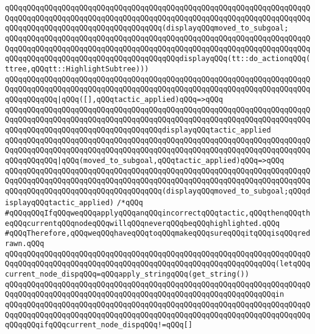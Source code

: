 \verb|qQQqqQQqqQQqqQQqqQQqqQQqqQQqqQQqqQQqqQQqqQQqqQQqqQQqqQQqqQQqqQQqqQQqqQQqqQQqqQQqqQQqqQQqqQQqqQQqqQQqqQQqqQQqqQQqqQQqqQQqqQQqqQQqqQQqqQQqqQQqqQQqqQQqqQQqqQQqqQQqqQQqqQQqqQQqqQQq(displayqQQqmoved_to_subgoal;|\newline
\verb|qQQqqQQqqQQqqQQqqQQqqQQqqQQqqQQqqQQqqQQqqQQqqQQqqQQqqQQqqQQqqQQqqQQqqQQqqQQqqQQqqQQqqQQqqQQqqQQqqQQqqQQqqQQqqQQqqQQqqQQqqQQqqQQqqQQqqQQqqQQqqQQqqQQqqQQqqQQqqQQqqQQqqQQqqQQqqQQqqQQqdisplayqQQq(tt::do_actionqQQq(ttree,qQQqtt::HighlightSubtree)))|\newline
\verb|qQQqqQQqqQQqqQQqqQQqqQQqqQQqqQQqqQQqqQQqqQQqqQQqqQQqqQQqqQQqqQQqqQQqqQQqqQQqqQQqqQQqqQQqqQQqqQQqqQQqqQQqqQQqqQQqqQQqqQQqqQQqqQQqqQQqqQQqqQQqqQQqqQQqqQQq|\verb#|qQQq([],qQQqtactic_applied)qQQq=>qQQq#\newline
\verb|qQQqqQQqqQQqqQQqqQQqqQQqqQQqqQQqqQQqqQQqqQQqqQQqqQQqqQQqqQQqqQQqqQQqqQQqqQQqqQQqqQQqqQQqqQQqqQQqqQQqqQQqqQQqqQQqqQQqqQQqqQQqqQQqqQQqqQQqqQQqqQQqqQQqqQQqqQQqqQQqqQQqqQQqqQQqqQQqdisplayqQQqtactic_applied|\newline
\verb|qQQqqQQqqQQqqQQqqQQqqQQqqQQqqQQqqQQqqQQqqQQqqQQqqQQqqQQqqQQqqQQqqQQqqQQqqQQqqQQqqQQqqQQqqQQqqQQqqQQqqQQqqQQqqQQqqQQqqQQqqQQqqQQqqQQqqQQqqQQqqQQqqQQqqQQq|\verb#|qQQq(moved_to_subgoal,qQQqtactic_applied)qQQq=>qQQq#\newline
\verb|qQQqqQQqqQQqqQQqqQQqqQQqqQQqqQQqqQQqqQQqqQQqqQQqqQQqqQQqqQQqqQQqqQQqqQQqqQQqqQQqqQQqqQQqqQQqqQQqqQQqqQQqqQQqqQQqqQQqqQQqqQQqqQQqqQQqqQQqqQQqqQQqqQQqqQQqqQQqqQQqqQQqqQQqqQQqqQQq(displayqQQqmoved_to_subgoal;qQQqdisplayqQQqtactic_applied)|\newline
\verb|/*qQQq|\newline
\verb|#qQQqqQQqIfqQQqweqQQqapplyqQQqanqQQqincorrectqQQqtactic,qQQqthenqQQqtheqQQqcurrentqQQqnodeqQQqwillqQQqneverqQQqbeqQQqhighlighted.qQQq|\newline
\verb|#qQQqTherefore,qQQqweqQQqhaveqQQqtoqQQqmakeqQQqsureqQQqitqQQqisqQQqredrawn.qQQq|\newline
\verb|qQQqqQQqqQQqqQQqqQQqqQQqqQQqqQQqqQQqqQQqqQQqqQQqqQQqqQQqqQQqqQQqqQQqqQQqqQQqqQQqqQQqqQQqqQQqqQQqqQQqqQQqqQQqqQQqqQQqqQQqqQQqqQQqqQQq(letqQQqcurrent_node_dispqQQq=qQQqapply_stringqQQq(get_string())|\newline
\verb|qQQqqQQqqQQqqQQqqQQqqQQqqQQqqQQqqQQqqQQqqQQqqQQqqQQqqQQqqQQqqQQqqQQqqQQqqQQqqQQqqQQqqQQqqQQqqQQqqQQqqQQqqQQqqQQqqQQqqQQqqQQqqQQqqQQqin|\newline
\verb|qQQqqQQqqQQqqQQqqQQqqQQqqQQqqQQqqQQqqQQqqQQqqQQqqQQqqQQqqQQqqQQqqQQqqQQqqQQqqQQqqQQqqQQqqQQqqQQqqQQqqQQqqQQqqQQqqQQqqQQqqQQqqQQqqQQqqQQqqQQqqQQqqQQqifqQQqcurrent_node_dispqQQq!=qQQq[]|\newline
